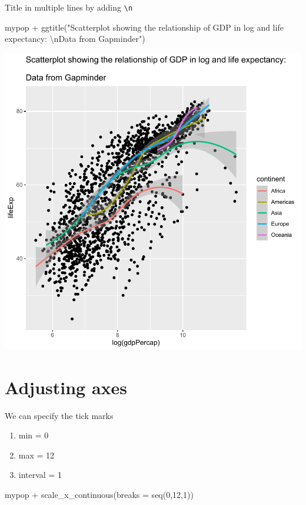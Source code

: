 \documentclass[
]{book}
\makeatletter
\newenvironment{Shaded}{\begin{snugshade}}{\end{snugshade}}
\newcommand{\AttributeTok}[1]{\textcolor[rgb]{0.61,0.61,0.61}{#1}}
\newcommand{\DecValTok}[1]{\textcolor[rgb]{0.06,0.06,0.06}{#1}}
\newcommand{\FunctionTok}[1]{\textcolor[rgb]{0,0,0}{#1}}
\newcommand{\NormalTok}[1]{#1}
\newcommand{\SpecialCharTok}[1]{\textcolor[rgb]{0,0,0}{#1}}
\newcommand{\StringTok}[1]{\textcolor[rgb]{0.5,0.5,0.5}{#1}}
\providecommand{\tightlist}{%
  \setlength{\itemsep}{0pt}\setlength{\parskip}{0pt}}
\newenvironment{kframe}{%
\medskip{}
\setlength{\fboxsep}{.8em}
 \def\at@end@of@kframe{}%
 \ifinner\ifhmode%
  \def\at@end@of@kframe{\end{minipage}}%
  \begin{minipage}{\columnwidth}%
 \fi\fi%
 \def\FrameCommand##1{\hskip\@totalleftmargin \hskip-\fboxsep
 \colorbox{shadecolor}{##1}\hskip-\fboxsep
     \hskip-\linewidth \hskip-\@totalleftmargin \hskip\columnwidth}%
 \MakeFramed {\advance\hsize-\width
   \@totalleftmargin\z@ \linewidth\hsize
   \@setminipage}}%
 {\par\unskip\endMakeFramed%
 \at@end@of@kframe}
\renewenvironment{Shaded}{\begin{kframe}}{\end{kframe}}
\makeatother
\begin{document}
Title in multiple lines by adding \texttt{\textbackslash{}n}

\begin{Shaded}
\begin{Highlighting}[]
\NormalTok{mypop }\SpecialCharTok{+} \FunctionTok{ggtitle}\NormalTok{(}\StringTok{"Scatterplot showing the relationship of GDP in log and life expectancy:}
\StringTok{                }\SpecialCharTok{\textbackslash{}n}\StringTok{Data from Gapminder"}\NormalTok{)}
\end{Highlighting}
\end{Shaded}

\begin{center}\includegraphics[width=0.7\linewidth,keepaspectratio]{Multivariable_Data_Analysis_files/figure-latex/unnamed-chunk-38-1} \end{center}

\hypertarget{adjusting-axes}{%
\section{Adjusting axes}\label{adjusting-axes}}

We can specify the tick marks

\begin{enumerate}
\def\labelenumi{\arabic{enumi}.}
\tightlist
\item
  min = 0
\item
  max = 12
\item
  interval = 1
\end{enumerate}

\begin{Shaded}
\begin{Highlighting}[]
\NormalTok{mypop }\SpecialCharTok{+} \FunctionTok{scale\_x\_continuous}\NormalTok{(}\AttributeTok{breaks =} \FunctionTok{seq}\NormalTok{(}\DecValTok{0}\NormalTok{,}\DecValTok{12}\NormalTok{,}\DecValTok{1}\NormalTok{))}
\end{Highlighting}
\end{Shaded}
\end{document}

